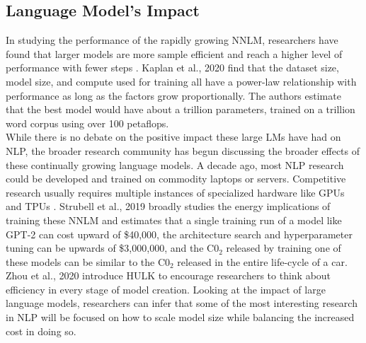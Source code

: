 \subsection{Language Model's Impact}
\label{chap:prior:sec:lm:effects}
In studying the performance of the rapidly growing NNLM, researchers have found that larger models are more sample efficient and reach a higher level of performance with fewer steps \cite{Kaplan2020ScalingLF}. Kaplan et al., 2020 find that the dataset size, model size, and compute used for training all have a power-law relationship with performance as long as the factors grow proportionally. The authors estimate that the best model would have about a trillion parameters, trained on a trillion word corpus using over 100 petaflops.\\
While there is no debate on the positive impact these large LMs have had on NLP, the broader research community has begun discussing the broader effects of these continually growing language models. A decade ago, most NLP research could be developed and trained on commodity laptops or servers. Competitive research usually requires multiple instances of specialized hardware like GPUs and TPUs \cite{Strubell2019EnergyAP}. Strubell et al., 2019 broadly studies the energy implications of training these NNLM and estimates that a single training run of a model like GPT-2 can cost upward of \$40,000, the architecture search and hyperparameter tuning can be upwards of \$3,000,000, and the C$0_2$ released by training one of these models can be similar to the C$0_2$ released in the entire life-cycle of a car. Zhou et al., 2020 \cite{Zhou2020HULKAE} introduce HULK to encourage researchers to think about efficiency in every stage of model creation. Looking at the impact of large language models, researchers can infer that some of the most interesting research in NLP will be focused on how to scale model size while balancing the increased cost in doing so. \\
